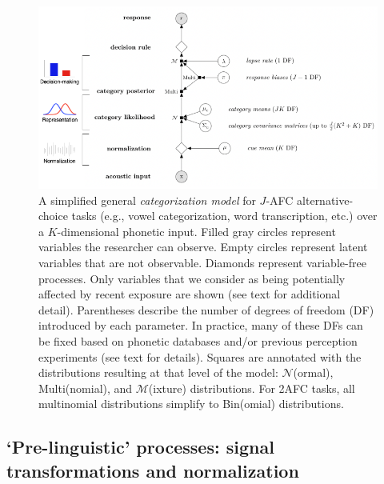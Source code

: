 \documentclass[
  11pt,
  english,
  man,floatsintext]{apa6}
\begin{document}
\begin{figure}[h]
\begin{center}
\includegraphics[width=.9\columnwidth]{../figures/diagrams/graphical-model.png}
  \caption{A simplified general {\em categorization model} for $J$-AFC alternative-choice tasks (e.g., vowel categorization, word transcription, etc.) over a $K$-dimensional phonetic input. Filled gray circles represent variables the researcher can observe. Empty circles represent latent variables that are not observable. Diamonds represent variable-free processes. Only variables that we consider as being potentially affected by recent exposure are shown (see text for additional detail). Parentheses describe the number of degrees of freedom (DF) introduced by each parameter. In practice, many of these DFs can be fixed based on phonetic databases and/or previous perception experiments (see text for details). Squares are annotated with the distributions resulting at that level of the model: $\mathcal{N}$(ormal), Multi(nomial), and $\mathcal{M}$(ixture) distributions. For 2AFC tasks, all multinomial distributions simplify to Bin(omial) distributions.} \label{fig:model-perceptual-decision-making}
\end{center}
\end{figure}

\hypertarget{pre-linguistic-processes-signal-transformations-and-normalization}{%
\subsection{`Pre-linguistic' processes: signal transformations and normalization}\label{pre-linguistic-processes-signal-transformations-and-normalization}}
\end{document}
